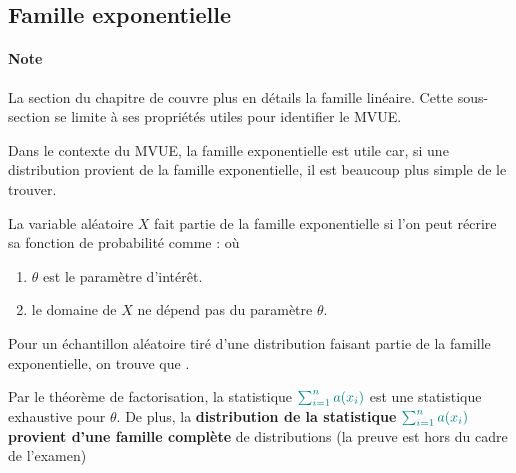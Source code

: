 \documentclass[french]{article}
\begin{document}
\begin{multicols*}{2}
\columnbreak
\subsection{Famille exponentielle}\label{subsec:FamExpMVUE}
\paragraph{Note}	La section \underline{\textit{}} du chapitre de \underline{\textit{}} couvre plus en détails la famille linéaire. Cette sous-section se limite à ses propriétés utiles pour identifier le MVUE.

\bigskip

\begin{rappel_enhanced}[Contexte]
Dans le contexte du MVUE, la famille exponentielle est utile car, si une distribution provient de la famille exponentielle, il est beaucoup plus simple de le trouver.
\end{rappel_enhanced}

\begin{definitionNOHFILL}
La variable aléatoire $X$ fait partie de la famille exponentielle si l'on peut récrire sa fonction de probabilité comme :  où 
\begin{enumerate}[label = \circled{\arabic*}{trueblue}]
	\item	$\theta$ est le paramètre d'intérêt.
	\item	le domaine de $X$ ne dépend pas du paramètre $\theta$.
\end{enumerate}
\end{definitionNOHFILL}

\begin{definitionNOHFILLprop}
Pour un échantillon aléatoire tiré d'une distribution faisant partie de la famille exponentielle, on trouve que .

\bigskip

Par le théorème de factorisation, la statistique $\textcolor{teal}{\sum_{i = 1}^{n} a(x_{i})}$ est une statistique exhaustive pour $\theta$. De plus, la \textbf{distribution de la statistique} $\textcolor{teal}{\sum_{i = 1}^{n} a(x_{i})}$ \textbf{provient d'une famille complète} de distributions (la preuve est hors du cadre de l'examen)
\end{definitionNOHFILLprop}


\end{multicols*}
\end{document}
